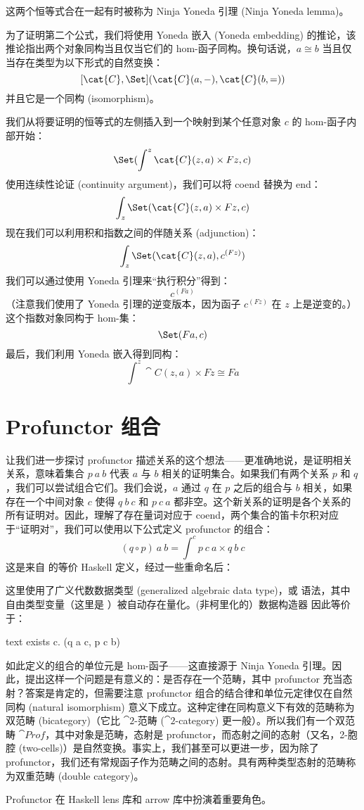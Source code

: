 这两个恒等式合在一起有时被称为 Ninja Yoneda 引理 (Ninja Yoneda lemma)。

为了证明第二个公式，我们将使用 Yoneda 嵌入 (Yoneda embedding) 的推论，该推论指出两个对象同构当且仅当它们的 hom-函子同构。换句话说，$a \cong b$ 当且仅当存在类型为以下形式的自然变换：
\[[\cat{C}, \Set](\cat{C}(a, -), \cat{C}(b, =))\]
并且它是一个同构 (isomorphism)。

我们从将要证明的恒等式的左侧插入到一个映射到某个任意对象 $c$ 的 hom-函子内部开始：
\[\Set(\int^z \cat{C}(z, a)\times{}F z, c)\]
使用连续性论证 (continuity argument)，我们可以将 coend 替换为 end：
\[\int_z \Set(\cat{C}(z, a)\times{}F z, c)\]
现在我们可以利用积和指数之间的伴随关系 (adjunction)：
\[\int_z \Set(\cat{C}(z, a), c^{(F z)})\]
我们可以通过使用 Yoneda 引理来“执行积分”得到：
\[c^{(F a)}\]
（注意我们使用了 Yoneda 引理的逆变版本，因为函子 $c^{(F z)}$ 在 $z$ 上是逆变的。）
这个指数对象同构于 hom-集：
\[\Set(F a, c)\]
最后，我们利用 Yoneda 嵌入得到同构：
\[\int^z \cat{C}(z, a)\times{}F z \cong F a\]

\section{Profunctor 组合}

让我们进一步探讨 profunctor 描述关系的这个想法——更准确地说，是证明相关关系，意味着集合 $p\ a\ b$ 代表 $a$ 与 $b$ 相关的证明集合。如果我们有两个关系 $p$ 和 $q$，我们可以尝试组合它们。我们会说，$a$ 通过 $q$ 在 $p$ 之后的组合与 $b$ 相关，如果存在一个中间对象 $c$ 使得 $q\ b\ c$ 和 $p\ c\ a$ 都非空。这个新关系的证明是各个关系的所有证明对。因此，理解了存在量词对应于 coend，两个集合的笛卡尔积对应于“证明对”，我们可以使用以下公式定义 profunctor 的组合：
\[(q \circ p)\ a\ b = \int^c p\ c\ a\times{}q\ b\ c\]
这是来自  的等价 Haskell 定义，经过一些重命名后：

这里使用了广义代数数据类型 (generalized algebraic data type)，或  语法，其中自由类型变量（这里是 ）被自动存在量化。(非柯里化的）数据构造器  因此等价于：

\begin{snip}{text}
exists c. (q a c, p c b)
\end{snip}
如此定义的组合的单位元是 hom-函子——这直接源于 Ninja Yoneda 引理。因此，提出这样一个问题是有意义的：是否存在一个范畴，其中 profunctor 充当态射？答案是肯定的，但需要注意 profunctor 组合的结合律和单位元定律仅在自然同构 (natural isomorphism) 意义下成立。这种定律在同构意义下有效的范畴称为双范畴 (bicategory)（它比 $\cat{2}$-范畴 ($\cat{2}$-category) 更一般）。所以我们有一个双范畴 $\cat{Prof}$，其中对象是范畴，态射是 profunctor，而态射之间的态射（又名，2-胞腔 (two-cells)）是自然变换。事实上，我们甚至可以更进一步，因为除了 profunctor，我们还有常规函子作为范畴之间的态射。具有两种类型态射的范畴称为双重范畴 (double category)。

Profunctor 在 Haskell lens 库和 arrow 库中扮演着重要角色。